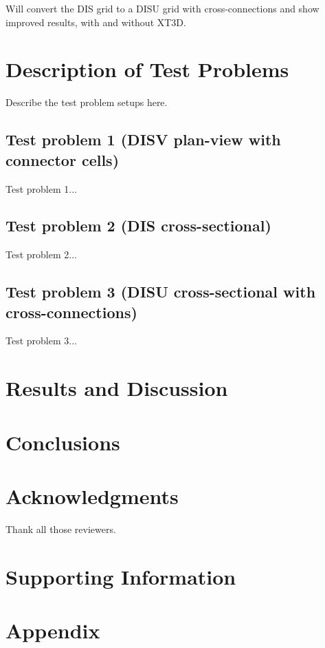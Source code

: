 \documentclass{article}
\begin{document}
Will convert the DIS grid to a DISU grid with cross-connections and show improved results, with and without XT3D.

\section{Description of Test Problems}

Describe the test problem setups here.

\subsection{Test problem 1 (DISV plan-view with connector cells)}

Test problem 1...

\subsection{Test problem 2 (DIS cross-sectional)}

Test problem 2...

\subsection{Test problem 3 (DISU cross-sectional with cross-connections)}

Test problem 3...

\section{Results and Discussion}

\section{Conclusions}

\section{Acknowledgments}
Thank all those reviewers.

\section{Supporting Information}

\section{Appendix}


\end{document}
